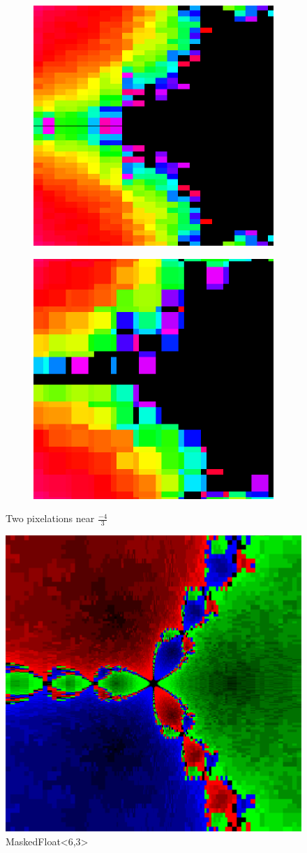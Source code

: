\documentclass[sigconf,authorversion,nonacm]{acmart}
\begin{document}
\begin{figure}
    \begin{subfigure}[P8]
        \centering
        \includegraphics[width=0.45\linewidth]{images/1-nozoom/P8-zoom.png}
    \end{subfigure}
    \quad
    \begin{subfigure}[I11F5]
        \centering
        \includegraphics[width=0.45\linewidth]{images/1-nozoom/I11F5-zoom.png}
    \end{subfigure}
    \caption{Two pixelations near $\frac{-4}{3}$}
    \label{fig:1-zoom}
\end{figure}

\begin{figure}
    \centering
    \includegraphics[width=0.9\linewidth]{images/1-mantissa/mf63.png}
    \caption{MaskedFloat<6,3>}
    \label{fig:1-mantissa}
\end{figure}
\end{document}
